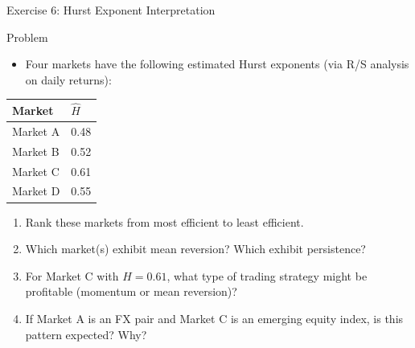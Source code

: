 \documentclass[9pt, aspectratio=169, t]{beamer}
\theoremstyle{definition}
\begin{document}
\begin{frame}{Exercise 6: Hurst Exponent Interpretation}
\begin{block}{Problem}
\begin{itemize}
\item Four markets have the following estimated Hurst exponents (via R/S analysis on daily returns):
\end{itemize}
\begin{center}
{\small
\renewcommand{\arraystretch}{1.2}
\begin{tabular}{ll}
\toprule
\textbf{Market} & \textbf{$\hat{H}$} \\
\midrule
Market A & 0.48 \\
Market B & 0.52 \\
Market C & 0.61 \\
Market D & 0.55 \\
\bottomrule
\end{tabular}
}
\end{center}
\end{block}
\begin{enumerate}
    \item Rank these markets from most efficient to least efficient.
    \item Which market(s) exhibit mean reversion? Which exhibit persistence?
    \item For Market C with $H = 0.61$, what type of trading strategy might be profitable (momentum or mean reversion)?
    \item If Market A is an FX pair and Market C is an emerging equity index, is this pattern expected? Why?
\end{enumerate}
\end{frame}
\end{document}
